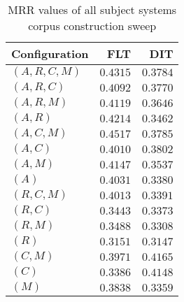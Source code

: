 
\begin{table}
\begin{spacing}{1.2}
\centering
\caption{MRR values of all subject systems corpus construction sweep}
\label{table:all_corpus_sweep}
\vspace{0.2em}
\begin{tabular}{lrr}
\toprule
Configuration &           FLT &           DIT \\
\midrule
  $(A,R,C,M)$ &      $0.4315$ &      $0.3784$ \\
    $(A,R,C)$ &      $0.4092$ &      $0.3770$ \\
    $(A,R,M)$ &      $0.4119$ &      $0.3646$ \\
      $(A,R)$ &      $0.4214$ &      $0.3462$ \\
    $(A,C,M)$ & $\bm{0.4517}$ &      $0.3785$ \\
      $(A,C)$ &      $0.4010$ &      $0.3802$ \\
      $(A,M)$ &      $0.4147$ &      $0.3537$ \\
        $(A)$ &      $0.4031$ &      $0.3380$ \\
    $(R,C,M)$ &      $0.4013$ &      $0.3391$ \\
      $(R,C)$ &      $0.3443$ &      $0.3373$ \\
      $(R,M)$ &      $0.3488$ &      $0.3308$ \\
        $(R)$ &      $0.3151$ &      $0.3147$ \\
      $(C,M)$ &      $0.3971$ & $\bm{0.4165}$ \\
        $(C)$ &      $0.3386$ &      $0.4148$ \\
        $(M)$ &      $0.3838$ &      $0.3359$ \\
\bottomrule
\end{tabular}

\end{spacing}
\end{table}

